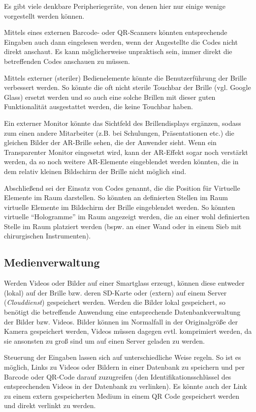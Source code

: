 Es gibt viele denkbare Peripheriegeräte, von denen hier nur einige wenige vorgestellt werden können.

Mittels eines externen Barcode- oder QR-Scanners könnten entsprechende Eingaben auch dann eingelesen werden, wenn der Angestellte die Codes nicht direkt anschaut. Es kann möglicherweise unpraktisch sein, immer direkt die betreffenden Codes anschauen zu müssen. 

Mittels externer (steriler) Bedienelemente könnte die Benutzerführung der Brille verbessert werden. So könnte die oft nicht sterile Touchbar der Brille (vgl. Google Glass) ersetzt werden und so auch eine solche Brillen mit dieser guten Funktionalität ausgestattet werden, die keine Touchbar haben. 

Ein externer Monitor könnte das Sichtfeld des Brillendisplays ergänzen, sodass zum einen andere Mitarbeiter (z.B. bei Schulungen, Präsentationen etc.) die gleichen Bilder der AR-Brille sehen, die der Anwender sieht. Wenn ein Transparenter Monitor eingesetzt wird, kann der AR-Effekt sogar noch verstärkt werden, da so noch weitere AR-Elemente eingeblendet werden könnten, die in dem relativ kleinen Bildschirm der Brille nicht möglich sind.

Abschließend sei der Einsatz von Codes genannt, die die Position für Virtuelle Elemente im Raum darstellen. So könnten an definierten Stellen im Raum virtuelle Elemente im Bildschirm der Brille eingeblendet werden. So könnten virtuelle \enquote{Hologramme} im Raum angezeigt werden, die an einer wohl definierten Stelle im Raum platziert werden (bspw. an einer Wand oder in einem Sieb mit chirurgischen Instrumenten).
%
%
%
%
%
%
\subsection{Medienverwaltung}
\label{sec:Medienverwaltung}
Werden Videos oder Bilder auf einer Smartglass erzeugt, können diese entweder (lokal) auf der Brille bzw. deren SD-Karte oder (extern) auf einem Server (\emph{Clouddienst}) gespeichert werden. Werden die Bilder lokal gespeichert, so benötigt die betreffende Anwendung eine entsprechende Datenbankverwaltung der Bilder bzw. Videos. Bilder können im Normalfall in der Originalgröße der Kamera gespeichert werden, Videos müssen dagegen evtl. komprimiert werden, da sie ansonsten zu groß sind um auf einen Server geladen zu werden. 

Steuerung der Eingaben lassen sich auf unterschiedliche Weise regeln. So ist es möglich, Links zu Videos oder Bildern in einer Datenbank zu speichern und per Barcode oder QR-Code darauf zuzugreifen (den Identifikationsschlüssel des entsprechenden Videos in der Datenbank zu verlinken). Es könnte auch der Link zu einem extern gespeicherten Medium in einem QR Code gespeichert werden und direkt verlinkt zu werden. 

